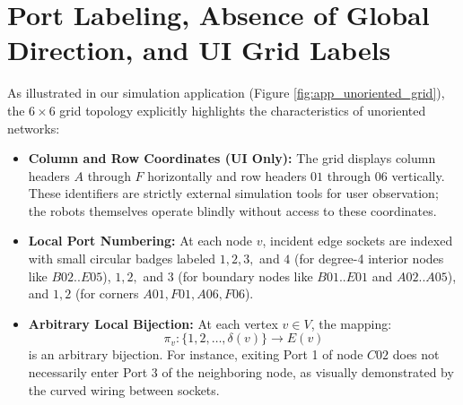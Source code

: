 \documentclass[11pt,a4paper]{report}
\begin{document}
\section{Port Labeling, Absence of Global Direction, and UI Grid Labels}
As illustrated in our simulation application (Figure \ref{fig:app_unoriented_grid}), the $6 \times 6$ grid topology explicitly highlights the characteristics of unoriented networks:
\begin{itemize}
    \item \textbf{Column and Row Coordinates (UI Only):} The grid displays column headers $A$ through $F$ horizontally and row headers $01$ through $06$ vertically. These identifiers are strictly external simulation tools for user observation; the robots themselves operate blindly without access to these coordinates.
    \item \textbf{Local Port Numbering:} At each node $v$, incident edge sockets are indexed with small circular badges labeled $1, 2, 3,$ and $4$ (for degree-4 interior nodes like $B02..E05$), $1, 2,$ and $3$ (for boundary nodes like $B01..E01$ and $A02..A05$), and $1, 2$ (for corners $A01, F01, A06, F06$).
    \item \textbf{Arbitrary Local Bijection:} At each vertex $v \in V$, the mapping:
    \begin{equation}
        \pi_v: \{1, 2, \dots, \delta(v)\} \to E(v)
    \end{equation}
    is an arbitrary bijection. For instance, exiting Port 1 of node $C02$ does not necessarily enter Port 3 of the neighboring node, as visually demonstrated by the curved wiring between sockets.
\end{itemize}
\end{document}
